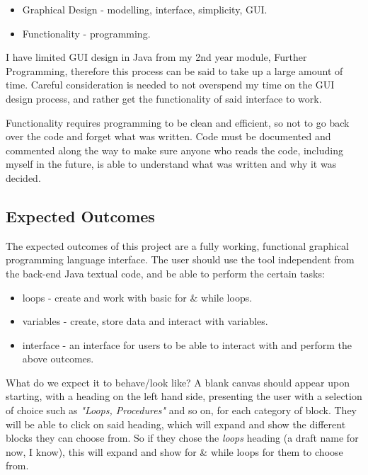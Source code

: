 \documentclass[a4paper, 12pt]{article}
\begin{document}
            \begin{itemize}
                \item Graphical Design - modelling, interface, simplicity, GUI.
                \item Functionality - programming.
            \end{itemize}

            I have limited GUI design in Java from my 2nd year module, Further Programming, therefore this 
            process can be said to take up a large amount of time. Careful consideration is needed to 
            not overspend my time on the GUI design process, and rather get the functionality of said 
            interface to work.

            Functionality requires programming to be clean and efficient, so not to go back over the code 
            and forget what was written. Code must be documented and commented along the way to make sure 
            anyone who reads the code, including myself in the future, is able to understand what was 
            written and why it was decided.

            \subsection{Expected Outcomes}
            The expected outcomes of this project are a fully working, functional graphical programming 
            language interface. The user should use the tool independent from the back-end Java textual 
            code, and be able to perform the certain tasks:

            \begin{itemize}
                \item loops - create and work with basic for \& while loops.
                \item variables - create, store data and interact with variables.
                \item interface - an interface for users to be able to interact with and perform the
                above outcomes.
            \end{itemize}

            What do we expect it to behave/look like? A blank canvas should appear upon starting, with
            a heading on the left hand side, presenting the user with a selection of choice such as
            \textit{"Loops, Procedures"} and so on, for each category of block. They will be able to click
            on said heading, which will expand and show the different blocks they can choose from. So if
            they chose the \textit{loops} heading (a draft name for now, I know), this will expand and show
            for \& while loops for them to choose from.
\end{document}
